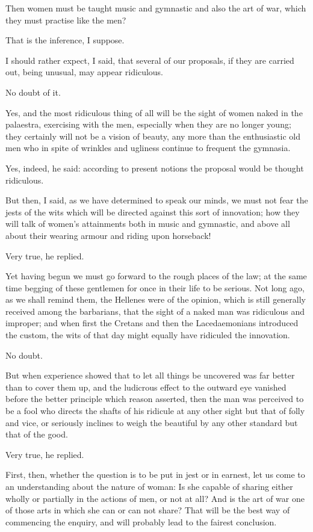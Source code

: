 Then women must be taught music and gymnastic and also the art of war,
which they must practise like the men?

That is the inference, I suppose.

I should rather expect, I said, that several of our proposals, if they
are carried out, being unusual, may appear ridiculous.

No doubt of it.

Yes, and the most ridiculous thing of all will be the sight of women
naked in the palaestra, exercising with the men, especially when they
are no longer young; they certainly will not be a vision of beauty, any
more than the enthusiastic old men who in spite of wrinkles and ugliness
continue to frequent the gymnasia.

Yes, indeed, he said: according to present notions the proposal would be
thought ridiculous.

But then, I said, as we have determined to speak our minds, we must not
fear the jests of the wits which will be directed against this sort of
innovation; how they will talk of women's attainments both in music
and gymnastic, and above all about their wearing armour and riding upon
horseback!

Very true, he replied.

Yet having begun we must go forward to the rough places of the law; at
the same time begging of these gentlemen for once in their life to be
serious. Not long ago, as we shall remind them, the Hellenes were of the
opinion, which is still generally received among the barbarians, that
the sight of a naked man was ridiculous and improper; and when first the
Cretans and then the Lacedaemonians introduced the custom, the wits of
that day might equally have ridiculed the innovation.

No doubt.

But when experience showed that to let all things be uncovered was far
better than to cover them up, and the ludicrous effect to the outward
eye vanished before the better principle which reason asserted, then the
man was perceived to be a fool who directs the shafts of his ridicule
at any other sight but that of folly and vice, or seriously inclines to
weigh the beautiful by any other standard but that of the good.

Very true, he replied.

First, then, whether the question is to be put in jest or in earnest,
let us come to an understanding about the nature of woman: Is she
capable of sharing either wholly or partially in the actions of men, or
not at all? And is the art of war one of those arts in which she can or
can not share? That will be the best way of commencing the enquiry, and
will probably lead to the fairest conclusion.

